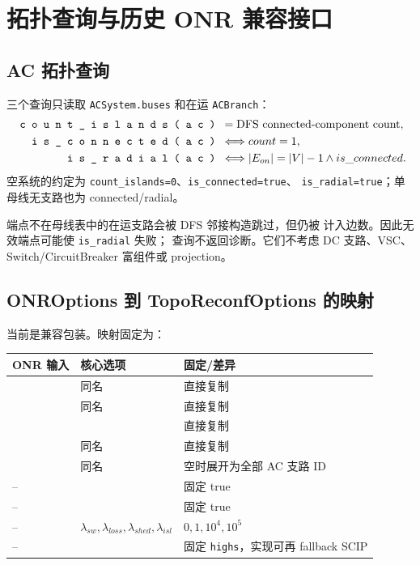 
\section{拓扑查询与历史 ONR 兼容接口}\label{sec:nr-compat}

\subsection{AC 拓扑查询}

三个查询只读取 \texttt{ACSystem.buses} 和在运 \texttt{ACBranch}：
\begin{align}
\srcpath{count\_islands(ac)}&=\text{DFS connected-component count},\\
\srcpath{is\_connected(ac)}&\Longleftrightarrow count=1,\\
\srcpath{is\_radial(ac)}&\Longleftrightarrow |E_{on}|=|V|-1\land is\_connected.
\end{align}
空系统的约定为 \texttt{count\_islands=0}、\texttt{is\_connected=true}、
\texttt{is\_radial=true}；单母线无支路也为 connected/radial。

端点不在母线表中的在运支路会被 DFS 邻接构造跳过，但仍被
 计入边数。因此无效端点可能使 \texttt{is\_radial} 失败；
查询不返回诊断。它们不考虑 DC 支路、VSC、Switch/CircuitBreaker 富组件或 projection。

\subsection{ONROptions 到 TopoReconfOptions 的映射}

 当前是兼容包装。映射固定为：
\begin{center}\small
\begin{tabular}{@{}L{5.0cm}L{5.0cm}L{4.5cm}@{}}
\toprule
ONR 输入 & 核心选项 & 固定/差异\\
\midrule
{} & 同名 & 直接复制\\
 & 同名 & 直接复制\\
 &  & 直接复制\\
 & 同名 & 直接复制\\
 & 同名 & 空时展开为全部 AC 支路 ID\\
-- &  & 固定 true\\
-- &  & 固定 true\\
-- & $\lambda_{sw},\lambda_{loss},\lambda_{shed},\lambda_{isl}$ & $0,1,10^4,10^5$\\
-- &  & 固定 \texttt{highs}，实现可再 fallback SCIP\\
\bottomrule
\end{tabular}
\end{center}

